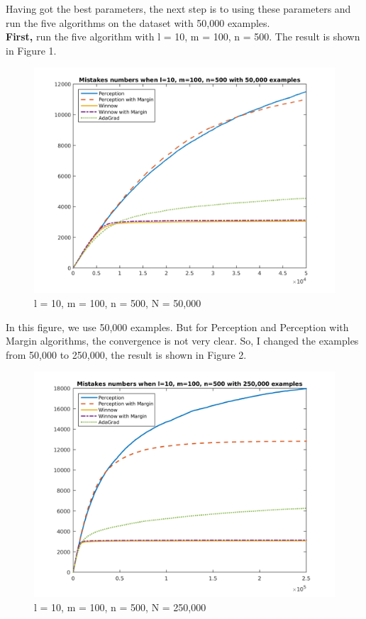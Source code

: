 \begin{enumerate}
Having got the best parameters, the next step is to using these parameters and run the five algorithms on the dataset with 50,000 examples.\\

{\bf First,} run the five algorithm with l = 10, m = 100, n = 500. The result is shown in Figure 1.\\

\begin{figure}[H] 
\begin{center}
\includegraphics[width=7in]{Ex1mistake1.png}
\caption{l = 10, m = 100, n = 500, N = 50,000}
\end{center}
\end{figure}

In this figure, we use 50,000 examples. But for Perception and Perception with Margin algorithms, the convergence is not very clear. So, I changed the examples from 50,000 to 250,000, the result is shown in Figure 2.\\

\begin{figure}[H] 
\begin{center}
\includegraphics[width=7in]{Ex1mistake2.png}
\caption{l = 10, m = 100, n = 500, N = 250,000}
\end{center}
\end{figure}


\end{enumerate}
